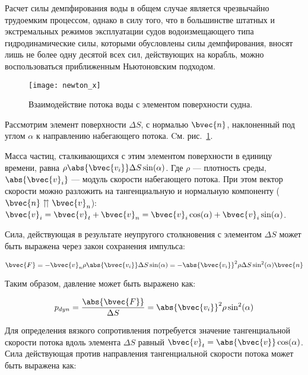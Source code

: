 
Расчет силы демпфирования воды в общем случае является чрезвычайно трудоемким процессом, однако в силу того, что в большинстве штатных и экстремальных режимов эксплуатации судов водоизмещающего типа гидродинамические силы, которыми обусловлены силы демпфирования, вносят лишь не более одну десятой всех сил, действующих на корабль, можно воспользоваться приближенным Ньютоновским подходом.

\begin{figure}[ht]
\begin{center}
\texttt{[image: newton\_x]}
\end{center}
\caption{Взаимодействие потока воды с элементом поверхности судна.}
\label{newton_x}
\end{figure}

Рассмотрим элемент поверхности $\Delta S$, с нормалью $\bvec{n}$, наклоненный под углом $\alpha$ к направлению набегающего потока. Cм. рис.~\ref{newton_x}.

Масса частиц, сталкивающихся с этим элементом поверхности в единицу времени, равна 
$\rho \abs{\bvec{v_i}} \Delta S \sin(\alpha)$. Где $\rho$ --- плотность среды, $\abs{\bvec{v}_i}$ --- модуль скорости набегающего потока. При этом вектор скорости можно разложить на тангенциальную и нормальную компоненту ($\bvec{n} \upuparrows \bvec{v}_n$): $\bvec{v}_{i}=\bvec{v}_t + \bvec{v}_n = \bvec{v}_{i} \cos(\alpha) + \bvec{v}_{i} \sin(\alpha)$.

Сила, действующая в результате неупругого столкновения с элементом $\Delta S$
может быть выражена через закон сохранения импульса:

\begin{equation}
	\bvec{F} = -\bvec{v}_n \rho \abs{\bvec{v_i}} \Delta S \sin(\alpha)
			 = -\abs{\bvec{v_i}}^2 \rho \Delta S \sin^2(\alpha) \bvec{n}
\end{equation}

Таким образом, давление может быть выражено как:

\begin{equation}
	p_{dyn} = \frac{\abs{\bvec{F}}}{\Delta S} = \abs{\bvec{v_i}}^2 \rho \sin^2(\alpha)
\end{equation}

Для определения вязкого сопротивления потребуется значение тангенциальной скорости потока вдоль элемента 
$\Delta S$ равный $\bvec{v}_t = \abs{\bvec{v}} \cos(\alpha)$. Сила действующая против направления тангенциальной скорости потока может быть выражена как:

